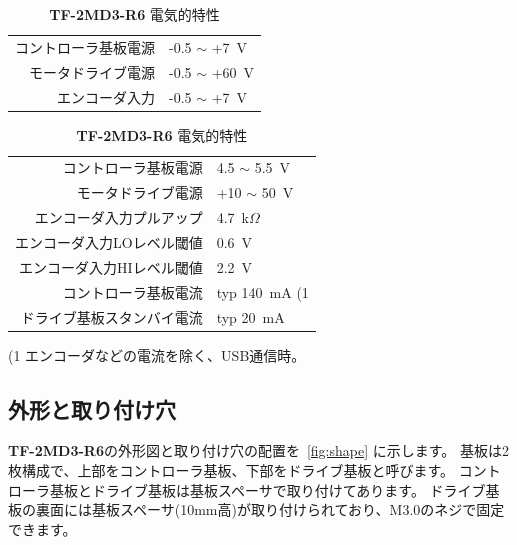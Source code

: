 \documentclass[11pt,a4j,openany]{jbook}
\begin{document}
\begin{table}[H]
\begin{minipage}[t]{0.44\hsize}
\caption{{\bf TF-2MD3-R6} 絶対最大定格}
\label{tb:abs_max6}
\centering\begin{tabular}{rl}
\toprule
コントローラ基板電源 & -0.5 $\sim$ +7~V \\
モータドライブ電源 & -0.5 $\sim$ +60~V \\
\midrule
エンコーダ入力 & -0.5 $\sim$ +7~V \\
\bottomrule
\end{tabular}
\end{minipage}
\begin{minipage}[t]{0.54\hsize}
\caption{{\bf TF-2MD3-R6} 電気的特性}
\label{tb:el_char6}
{\centering\begin{tabular}{rl}
\toprule
コントローラ基板電源 & 4.5 $\sim$ 5.5~V \\
モータドライブ電源 & +10 $\sim$ 50~V \\
\midrule
エンコーダ入力プルアップ & 4.7~k$\Omega$ \\
エンコーダ入力LOレベル閾値 & 0.6~V \\
エンコーダ入力HIレベル閾値 & 2.2~V \\
\midrule
コントローラ基板電流 & typ 140~mA {\footnotesize(1} \\
ドライブ基板スタンバイ電流 & typ 20~mA \\
\bottomrule
\end{tabular}
}
{\newline\smallskip\footnotesize{(1} エンコーダなどの電流を除く、USB通信時。}
\end{minipage}
\end{table}


\subsection{外形と取り付け穴}
\label{sec:外形と取り付け穴}

{\bf TF-2MD3-R6}の外形図と取り付け穴の配置を\figurename~\ref{fig:shape} に示します。
基板は2枚構成で、上部をコントローラ基板、下部をドライブ基板と呼びます。
コントローラ基板とドライブ基板は基板スペーサで取り付けてあります。
ドライブ基板の裏面には基板スペーサ(10mm高)が取り付けられており、M3.0のネジで固定できます。
\end{document}
